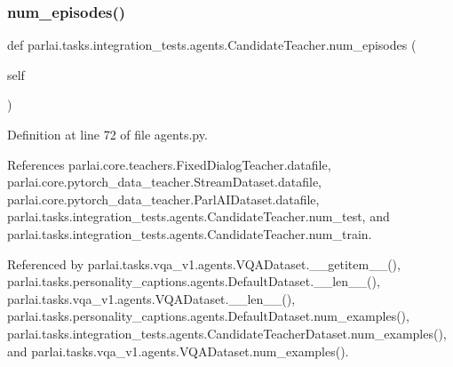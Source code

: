 \subsubsection{\texorpdfstring{num\+\_\+episodes()}{num\_episodes()}}
{\footnotesize\ttfamily def parlai.\+tasks.\+integration\+\_\+tests.\+agents.\+Candidate\+Teacher.\+num\+\_\+episodes (\begin{DoxyParamCaption}\item[{}]{self }\end{DoxyParamCaption})}



Definition at line 72 of file agents.\+py.



References parlai.\+core.\+teachers.\+Fixed\+Dialog\+Teacher.\+datafile, parlai.\+core.\+pytorch\+\_\+data\+\_\+teacher.\+Stream\+Dataset.\+datafile, parlai.\+core.\+pytorch\+\_\+data\+\_\+teacher.\+Parl\+A\+I\+Dataset.\+datafile, parlai.\+tasks.\+integration\+\_\+tests.\+agents.\+Candidate\+Teacher.\+num\+\_\+test, and parlai.\+tasks.\+integration\+\_\+tests.\+agents.\+Candidate\+Teacher.\+num\+\_\+train.



Referenced by parlai.\+tasks.\+vqa\+\_\+v1.\+agents.\+V\+Q\+A\+Dataset.\+\_\+\+\_\+getitem\+\_\+\+\_\+(), parlai.\+tasks.\+personality\+\_\+captions.\+agents.\+Default\+Dataset.\+\_\+\+\_\+len\+\_\+\+\_\+(), parlai.\+tasks.\+vqa\+\_\+v1.\+agents.\+V\+Q\+A\+Dataset.\+\_\+\+\_\+len\+\_\+\+\_\+(), parlai.\+tasks.\+personality\+\_\+captions.\+agents.\+Default\+Dataset.\+num\+\_\+examples(), parlai.\+tasks.\+integration\+\_\+tests.\+agents.\+Candidate\+Teacher\+Dataset.\+num\+\_\+examples(), and parlai.\+tasks.\+vqa\+\_\+v1.\+agents.\+V\+Q\+A\+Dataset.\+num\+\_\+examples().

